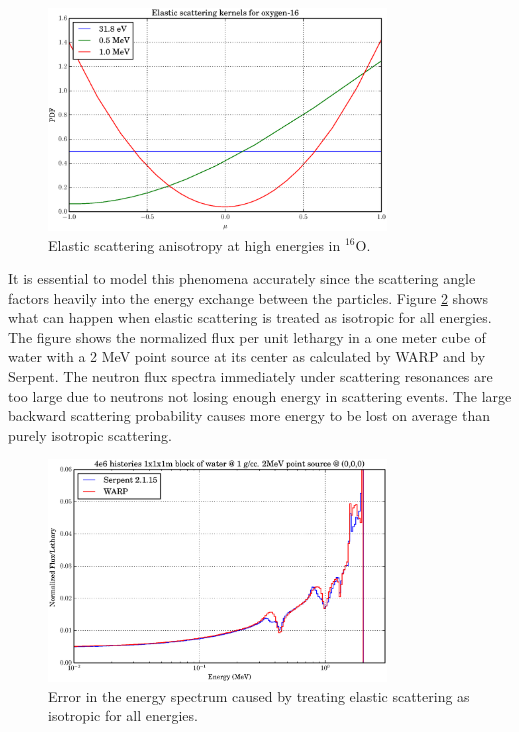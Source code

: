 \begin{figure}[h!] 
  \centering
    \includegraphics[width=0.8\textwidth]{graphics/scattering_anisotropy.eps}
     \caption{Elastic scattering anisotropy at high energies in $^{16}$O.  \label{scattering_anisotropy}}
\end{figure}

It is essential to model this phenomena accurately since the scattering angle factors heavily into the energy exchange between the particles.  Figure \ref{scattering_error} shows what can happen when elastic scattering is treated as isotropic for all energies.  The figure shows the normalized flux per unit lethargy in a one meter cube of water with a 2 MeV point source at its center as calculated by WARP and by Serpent.  The neutron flux spectra immediately under scattering resonances are too large due to neutrons not losing enough energy in scattering events. %
  The large backward scattering probability causes more energy to be lost on average than purely isotropic scattering.%

\begin{figure}[h!] 
  \centering
    \includegraphics[width=0.8\textwidth]{graphics/scattering_error.eps}
     \caption{Error in the energy spectrum caused by treating elastic scattering as isotropic for all energies.\label{scattering_error}}
\end{figure}


